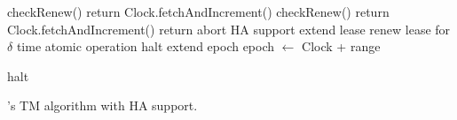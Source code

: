 \begin{algorithm}[htb]
\begin{algorithmic}[1]

\State checkRenew()
\State return Clock.fetchAndIncrement()
\EndProcedure
\Statex
{}
\State checkRenew()
 \State return Clock.fetchAndIncrement()
 \Else
 \State return {\sc abort}
\EndIf
\EndProcedure
\Statex
%
 \Comment HA support
 \label{l:lease-start} \Comment extend lease
 \State renew lease for $\delta$ time \Comment atomic operation
  halt \EndIf 
\EndIf  \label{l:lease-end}
  \label{l:epoch-start} \Comment extend epoch
\State epoch $\leftarrow$ Clock +  range
 
 halt \EndIf 
\EndIf  \label{l:epoch-end}
\EndProcedure

\end{algorithmic}
\caption{\sys's TM algorithm with HA support.}
\label{alg:ha}
\end{algorithm}

